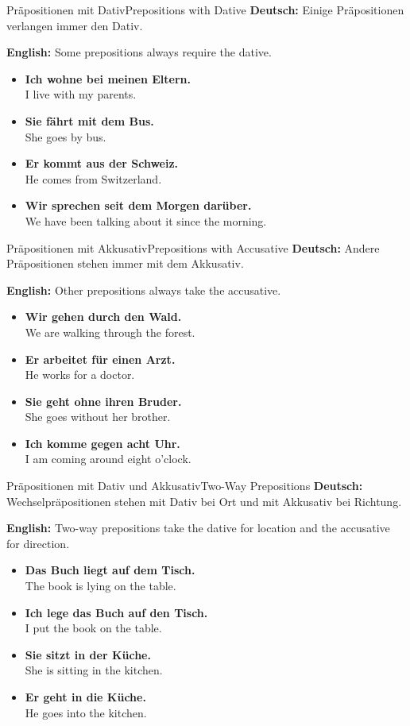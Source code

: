 \documentclass[a4paper,11pt]{article}
\newcommand{\GermanText}[1]{\textbf{Deutsch: }#1\par}
\newcommand{\EnglishText}[1]{{\color{SoftGray}\textbf{English: }#1\par}}
\newcommand{\ExampleItem}[2]{\item \textbf{#1}\\{\color{SoftGray}#2}}
\begin{document}
\begin{grammarentry}{Präpositionen mit Dativ}{Prepositions with Dative}
    \GermanText{Einige Präpositionen verlangen immer den Dativ.}
    \EnglishText{Some prepositions always require the dative.}
    \begin{exbox}
        \begin{itemize}
            \ExampleItem{Ich wohne bei meinen Eltern.}{I live with my parents.}
            \ExampleItem{Sie fährt mit dem Bus.}{She goes by bus.}
            \ExampleItem{Er kommt aus der Schweiz.}{He comes from Switzerland.}
            \ExampleItem{Wir sprechen seit dem Morgen darüber.}{We have been talking about it since the morning.}
        \end{itemize}
    \end{exbox}
\end{grammarentry}

\begin{grammarentry}{Präpositionen mit Akkusativ}{Prepositions with Accusative}
    \GermanText{Andere Präpositionen stehen immer mit dem Akkusativ.}
    \EnglishText{Other prepositions always take the accusative.}
    \begin{exbox}
        \begin{itemize}
            \ExampleItem{Wir gehen durch den Wald.}{We are walking through the forest.}
            \ExampleItem{Er arbeitet für einen Arzt.}{He works for a doctor.}
            \ExampleItem{Sie geht ohne ihren Bruder.}{She goes without her brother.}
            \ExampleItem{Ich komme gegen acht Uhr.}{I am coming around eight o'clock.}
        \end{itemize}
    \end{exbox}
\end{grammarentry}

\begin{grammarentry}{Präpositionen mit Dativ und Akkusativ}{Two-Way Prepositions}
    \GermanText{Wechselpräpositionen stehen mit Dativ bei Ort und mit Akkusativ bei Richtung.}
    \EnglishText{Two-way prepositions take the dative for location and the accusative for direction.}
    \begin{exbox}
        \begin{itemize}
            \ExampleItem{Das Buch liegt auf dem Tisch.}{The book is lying on the table.}
            \ExampleItem{Ich lege das Buch auf den Tisch.}{I put the book on the table.}
            \ExampleItem{Sie sitzt in der Küche.}{She is sitting in the kitchen.}
            \ExampleItem{Er geht in die Küche.}{He goes into the kitchen.}
        \end{itemize}
    \end{exbox}
\end{grammarentry}
\end{document}
